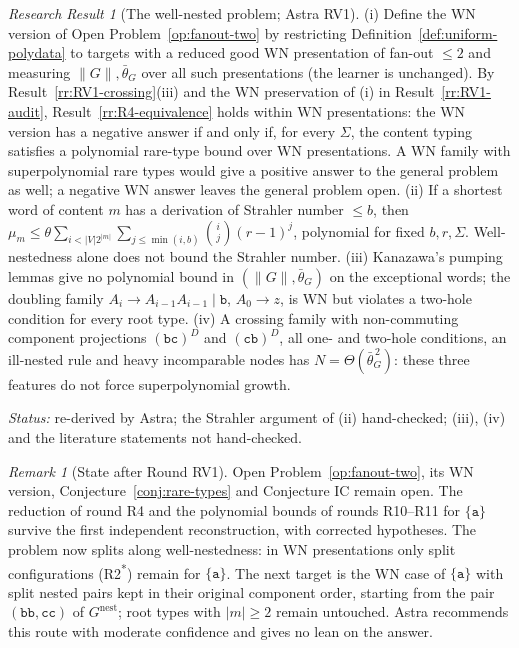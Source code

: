 \documentclass[11pt]{article}
\numberwithin{equation}{section}
\theoremstyle{plain}
\theoremstyle{definition}
\theoremstyle{remark}
\newtheorem{remark}[theorem]{Remark}
\newtheorem{rresult}[theorem]{Research Result}
\theoremstyle{plain}
\begin{document}
\begin{rresult}[The well-nested problem; Astra RV1]
\label{rr:RV1-wn}
(i) Define the WN version of Open Problem~\ref{op:fanout-two} by restricting
Definition~\ref{def:uniform-polydata} to targets with a reduced good WN presentation of fan-out
$\le2$ and measuring $\|G\|,\bar\theta_G$ over all such presentations (the learner is unchanged).
By Result~\ref{rr:RV1-crossing}(iii) and the WN preservation of (i) in
Result~\ref{rr:RV1-audit}, Result~\ref{rr:R4-equivalence} holds within WN presentations: the WN
version has a negative answer if and only if, for every $\Sigma$, the content typing satisfies a
polynomial rare-type bound over WN presentations.  A WN family with superpolynomial rare types
would give a positive answer to the general problem as well; a negative WN answer leaves the
general problem open.
(ii) If a shortest word of content $m$ has a derivation of Strahler number $\le b$, then
$\mu_m\le\theta\sum_{i<|V|2^{|m|}}\sum_{j\le\min(i,b)}\binom ij(r-1)^j$, polynomial for fixed
$b,r,\Sigma$.  Well-nestedness alone does not bound the Strahler number.
(iii) Kanazawa's pumping lemmas give no polynomial bound in $(\|G\|,\bar\theta_G)$ on the
exceptional words; the doubling family $A_i\to A_{i-1}A_{i-1}\mid\mathtt b$, $A_0\to z$, is WN but
violates a two-hole condition for every root type.
(iv) A crossing family with non-commuting component projections $(\mathtt{bc})^D$ and
$(\mathtt{cb})^D$, all one- and two-hole conditions, an ill-nested rule and heavy incomparable
nodes has $N=\Theta(\bar\theta_G^{\,2})$: these three features do not force superpolynomial
growth.
\end{rresult}
\noindent\emph{Status:} re-derived by Astra; the Strahler argument of (ii) hand-checked; (iii),
(iv) and the literature statements not hand-checked.

\begin{remark}[State after Round RV1]
\label{rem:RV1-state}
Open Problem~\ref{op:fanout-two}, its WN version, Conjecture~\ref{conj:rare-types} and Conjecture
IC remain open.  The reduction of round R4 and the polynomial bounds of rounds R10--R11 for
$\{\mathtt a\}$ survive the first independent reconstruction, with corrected hypotheses.  The
problem now splits along well-nestedness: in WN presentations only split configurations
(R2\textsuperscript{*}) remain for $\{\mathtt a\}$.  The next target is the WN case of $\{\mathtt a\}$
with split nested pairs kept in their original component order, starting from the pair
$(\mathtt{bb},\mathtt{cc})$ of $G^{\mathrm{nest}}$; root types with $|m|\ge2$ remain untouched.
Astra recommends this route with moderate confidence and gives no lean on the answer.
\end{remark}
\end{document}
